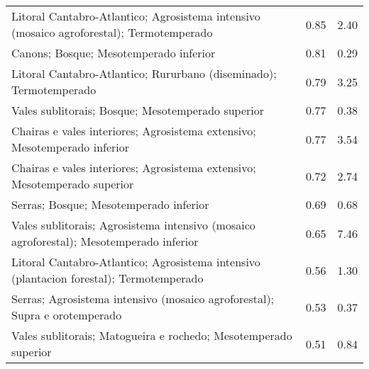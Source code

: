 \begin{table}[p]
\begin{tabular}{lrr}
  Litoral Cantabro-Atlantico; Agrosistema intensivo (mosaico agroforestal); Termotemperado & 0.85 & 2.40 \\ 
  Canons; Bosque; Mesotemperado inferior & 0.81 & 0.29 \\ 
  Litoral Cantabro-Atlantico; Rururbano (diseminado); Termotemperado & 0.79 & 3.25 \\ 
  Vales sublitorais; Bosque; Mesotemperado superior & 0.77 & 0.38 \\ 
  Chairas e vales interiores; Agrosistema extensivo; Mesotemperado inferior & 0.77 & 3.54 \\ 
  Chairas e vales interiores; Agrosistema extensivo; Mesotemperado superior & 0.72 & 2.74 \\ 
  Serras; Bosque; Mesotemperado inferior & 0.69 & 0.68 \\ 
  Vales sublitorais; Agrosistema intensivo (mosaico agroforestal); Mesotemperado inferior & 0.65 & 7.46 \\ 
  Litoral Cantabro-Atlantico; Agrosistema intensivo (plantacion forestal); Termotemperado & 0.56 & 1.30 \\ 
  Serras; Agrosistema intensivo (mosaico agroforestal); Supra e orotemperado & 0.53 & 0.37 \\ 
  Vales sublitorais; Matogueira e rochedo; Mesotemperado superior & 0.51 & 0.84 \\ 
   \hline
\end{tabular}
\end{table}
